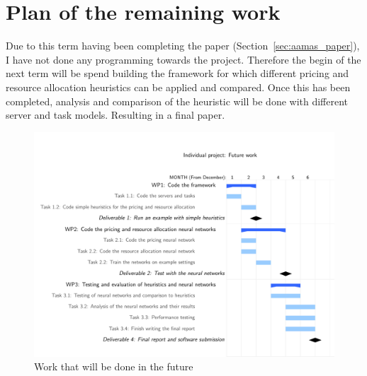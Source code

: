 \section{Plan of the remaining work}
Due to this term having been completing the paper (Section~\ref{sec:aamas_paper}), I have not done any programming
towards the project. Therefore the begin of the next term will be spend building the framework for which different pricing and
resource allocation heuristics can be applied and compared. Once this has been completed, analysis and comparison of
the heuristic will be done with different server and task models. Resulting in a final paper.
\begin{figure}[t]
    \centering
    \includegraphics[width=\linewidth]{future_work_grantt/future_grantt}
    \caption{Work that will be done in the future}
    \label{fig:future_grantt}
\end{figure}